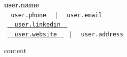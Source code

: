 \documentclass[letterpaper,10pt]{article}
\begin{document}
\begin{center}
    \textbf{\Huge {{ user.name }}} \\ \vspace{5pt}
    \small \faPhone* \texttt{ {{ user.phone }} } \hspace{1pt} $|$
    \hspace{1pt} \faEnvelope \hspace{2pt} \texttt{ {{ user.email }} } \hspace{1pt}  \\
    \hspace{1pt} \faLinkedin \hspace{2pt} \texttt{ \href{ {{ user.linkedin }} }{ {{ user.linkedin }} } } \hspace{1pt} \\
    \hspace{1pt} \faHome \hspace{2pt}\texttt{ \href{ {{ user.website }} }{ {{ user.website }} } }   \hspace{1pt} $|$
    \hspace{1pt} \faMapMarker* \hspace{2pt}\texttt{ {{ user.address }} }
    \\ \vspace{-3pt}
\end{center}

{{ content }}

\end{document}
